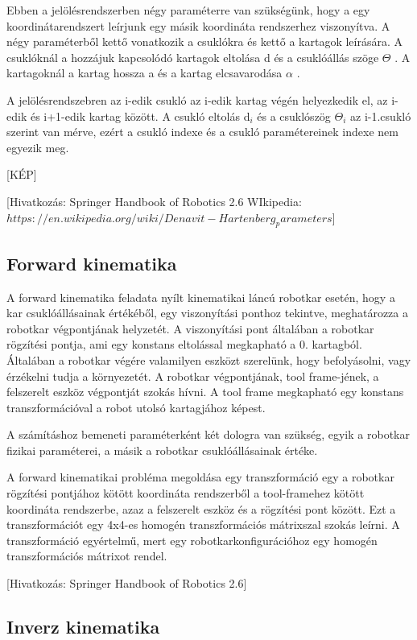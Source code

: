 Ebben a jelölésrendszerben négy paraméterre van szükségünk, hogy a egy koordinátarendszert leírjunk egy másik koordináta rendszerhez viszonyítva. A négy paraméterből kettő vonatkozik a csuklókra és kettő a kartagok leírására. A csuklóknál a hozzájuk kapcsolódó kartagok eltolása d és a csuklóállás szöge $\Theta$ . A kartagoknál a kartag hossza a és a kartag elcsavarodása $\alpha$ .

A jelölésrendszebren az i-edik csukló az i-edik kartag végén helyezkedik el, az i-edik és i+1-edik  kartag között. A csukló eltolás d$_i$ és a csuklószög $\Theta_i$ az i-1.csukló szerint van mérve, ezért a csukló indexe és a csukló paramétereinek indexe nem egyezik meg.

[KÉP]



[Hivatkozás: Springer Handbook of Robotics 2.6
WIkipedia: $https://en.wikipedia.org/wiki/Denavit-Hartenberg_parameters$]


\subsection{Forward kinematika}

A forward kinematika feladata nyílt kinematikai láncú robotkar esetén, hogy a kar csuklóállásainak értékéből, egy viszonyítási ponthoz tekintve, meghatározza a robotkar végpontjának helyzetét. A viszonyítási pont általában a robotkar rögzítési pontja, ami egy konstans eltolással megkapható a 0. kartagból. Általában a robotkar végére valamilyen eszközt szerelünk, hogy befolyásolni, vagy érzékelni tudja a környezetét. A robotkar végpontjának, tool frame-jének, a felszerelt eszköz végpontját szokás hívni. A tool frame megkapható egy konstans transzformációval a robot utolsó kartagjához képest.

A számításhoz bemeneti paraméterként két dologra van szükség, egyik a robotkar fizikai paraméterei, a másik a robotkar csuklóállásainak értéke.

A forward kinematikai probléma megoldása egy transzformáció egy a robotkar rögzítési pontjához kötött koordináta rendszerből a tool-framehez kötött koordináta rendszerbe, azaz a felszerelt eszköz és a rögzítési pont között. Ezt a transzformációt egy  4x4-es homogén transzformációs mátrixszal szokás leírni. A transzformáció egyértelmű, mert egy robotkarkonfigurációhoz egy homogén transzformációs mátrixot rendel. 

[Hivatkozás: Springer Handbook of Robotics 2.6]

\subsection{Inverz kinematika}
